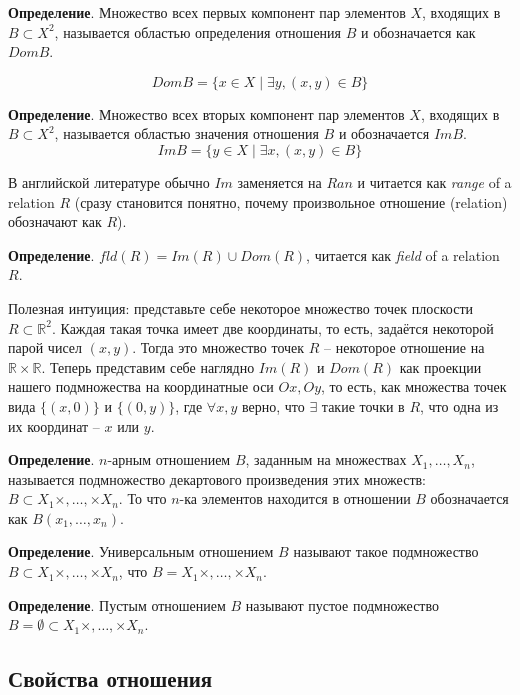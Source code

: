 \documentclass[a4paper]{book}
\begin{document}
\textbf{Определение}. Множество всех первых компонент пар элементов $X$, входящих в $B\subset X^2$, называется областью определения отношения $B$ и обозначается как $Dom B$. 

\begin{equation}
Dom B = \{x\in X\mid\exists y, (x,y)\in B\}
\end{equation}

\textbf{Определение}. Множество всех вторых компонент пар элементов $X$, входящих в $B\subset X^2$, называется областью значения отношения $B$ и обозначается $Im B$. 
\begin{equation}
Im B = \{y\in X\mid\exists x, (x,y)\in B\}
\end{equation}

В английской литературе обычно $Im$ заменяется на $Ran$ и читается как \textit{range} of a relation $R$ (сразу становится понятно, почему произвольное отношение (relation) обозначают как $R$).


\textbf{Определение}. $fld(R) = Im(R) \cup Dom(R)$, читается как \textit{field} of a relation $R$. 

Полезная интуиция: представьте себе некоторое множество точек плоскости $R\subset \mathbb{R}^2$. Каждая такая точка имеет две координаты, то есть, задаётся некоторой парой чисел $(x,y)$. Тогда это множество точек $R$ -- некоторое отношение на $\mathbb{R}\times \mathbb{R}$. Теперь представим себе наглядно $Im(R)$ и $Dom(R)$ как проекции нашего подмножества на координатные оси $Ox,Oy$, то есть, как множества точек вида $\{(x,0)\}$ и $\{(0,y)\}$, где $\forall x,y$ верно, что $\exists$ такие точки в $R$, что одна из их координат -- $x$ или $y$. 

\textbf{Определение}. $n$-арным отношением $B$, заданным на множествах $X_1,\dots, X_n$, называется подмножество декартового произведения этих множеств: $B\subset X_1 \times,\dots,\times X_n$. То что $n$-ка элементов находится в отношении $B$ обозначается как $B(x_1,\dots,x_n)$. 

\textbf{Определение}. Универсальным отношением $B$ называют такое подмножество $B\subset X_1 \times,\dots,\times X_n$, что $B = X_1 \times,\dots ,\times X_n$. 

\textbf{Определение}. Пустым отношением $B$ называют пустое подмножество $B = \emptyset\subset X_1 \times , \dots , \times X_n$. 



\subsection{Свойства отношения}
\end{document}
